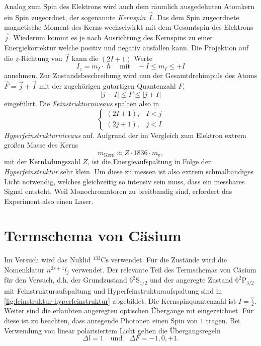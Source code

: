 \documentclass[../bericht.tex]{subfiles}
\begin{document}
      Analog zum Spin des Elektrons wird auch dem r\"aumlich ausgedehnten Atomkern ein Spin zugeordnet, der sogenannte \textit{Kernspin} $\vec{I}$. Das dem Spin zugeordnete magnetische Moment des Kerns wechselwirkt mit dem Gesamtspin des Elektrons $\vec{j}$. Wiederum kommt es je nach Ausrichtung des Kernspins zu einer Energiekorrektur welche positiv und negativ ausfallen kann. Die Projektion auf die $z$-Richtung von $\vec{I}$ kann die $(2I + 1)$ Werte
      \begin{equation*}
        I_z=m_I \cdot \hslash\quad\text{mit}\quad -I\le m_I \le +I
      \end{equation*}
      annehmen. Zur Zustandsbeschreibung wird nun der Gesamtdrehimpuls des Atoms $\vec{F}=\vec{j}+\vec{I}$ mit der zugeh\"origen gutartigen Quantenzahl $F$,
      \begin{equation*}
        |j-I| \le F\le |j + I|
      \end{equation*}
      eingef\"uhrt. Die \textit{Feinstrukturniveaus} spalten also in
      \begin{equation*}
        \begin{cases}
            (2I+1), & I<j\\
            (2j+1), & j<I
        \end{cases}
      \end{equation*}
      \textit{Hyperfeinstrukturniveaus} auf. Aufgrund der im Vergleich zum Elektron extrem gro\ss{}en Masse des Kerns
      \begin{equation*}
        m_\mathrm{Kern}\approx Z\cdot 1836 \cdot m_\mathrm{e},
      \end{equation*}
      mit der Kernladungszahl $Z$, ist die Energieaufspaltung in Folge der \textit{Hyperfeinstruktur} sehr klein. Um diese zu messen ist also extrem schmalbandiges Licht notwendig, welches gleichzeitig so intensiv sein muss, dass ein messbares Signal entsteht. Weil Monochromatoren zu breitbandig sind, erfordert das Experiment also einen Laser.


    \section{Termschema von C\"asium}
    \label{sec:termschema-caesium}

      Im Versuch wird das Nuklid $\mathrm{^{133}Cs}$ verwendet. F\"ur die Zust\"ande wird die Nomenklatur $n^{2s+1}l_j$  verwendet. Der relevante Teil des Termschemas von C\"asium f\"ur den Versuch, d.h. der Grundzustand $\mathrm{6^2 S_{1/2}}$ und der angeregte Zustand $\mathrm{6^2P_{3/2}}$ mit Feinstrukturaufspaltung und Hyperfeinstrukturaufspaltung sind in \cref{fig:feinstruktur-hyperfeinstruktur} abgebildet. Die Kernspinquantenzahl ist $I=\frac{7}{2}$. Weiter sind die erlaubten angeregten optischen \"Uberg\"ange rot eingezeichnet. F\"ur diese ist zu beachten, dass anregende Photonen einen Spin von $1$ tragen. Bei Verwendung von linear polarisiertem Licht gelten die \"Ubergangsregeln
      \begin{equation*}
        \Delta l = 1\quad \text{und}\quad \Delta F = -1,0,+1.
      \end{equation*}
\end{document}
